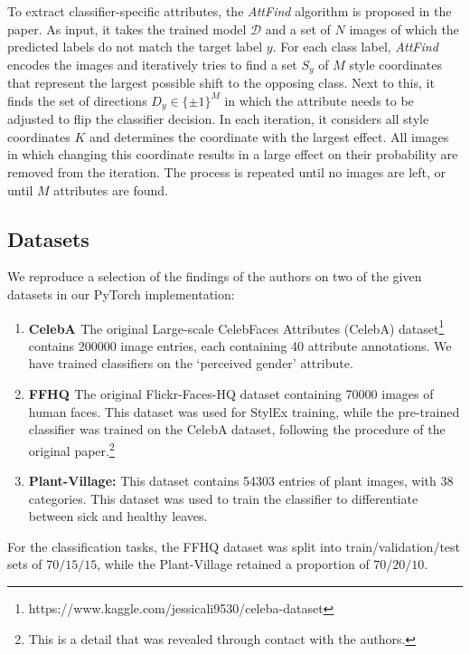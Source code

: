 To extract classifier-specific attributes, the \textit{AttFind} algorithm is proposed in the paper. As input, it takes the trained model $\mathcal{D}$ and a set of $N$ images of which the predicted labels do not match the target label $y$. For each class label, \textit{AttFind} encodes the images and iteratively tries to find a set $S_{y}$ of $M$ style coordinates that represent the largest possible shift to the opposing class. Next to this, it finds the set of directions $D_{y} \in \{\pm1\}^M$ in which the attribute needs to be adjusted to flip the classifier decision. In each iteration, it considers all style coordinates $K$ and determines the coordinate with the largest effect. All images in which changing this coordinate results in a large effect on their probability are removed from the iteration. The process is repeated until no images are left, or until $M$ attributes are found.


\subsection{Datasets}

We reproduce a selection of the findings of the authors on two of the given datasets in our PyTorch implementation:

\begin{enumerate}
    \item \textbf{CelebA \cite{liu2015faceattributes}}  The original Large-scale CelebFaces Attributes (CelebA) dataset\footnote{https://www.kaggle.com/jessicali9530/celeba-dataset} contains 200000 image entries, each containing 40 attribute annotations. We have trained classifiers on the `perceived gender' attribute.
    \item \textbf{FFHQ  \cite{orel2020lifespan}} The original Flickr-Faces-HQ dataset containing 70000 images of human faces. This dataset was used for StylEx training, while the pre-trained classifier was trained on the CelebA dataset, following the procedure of the original paper.\footnote{This is a detail that was revealed through contact with the authors.} 
    \item \textbf{Plant-Village:} This dataset contains 54303 entries of plant images, with 38 categories. This dataset was used to train the classifier to differentiate between sick and healthy leaves.
\end{enumerate}


For the classification tasks, the FFHQ dataset was split into train/validation/test sets of $70/15/15$, while the Plant-Village retained a proportion of $70/20/10$.

